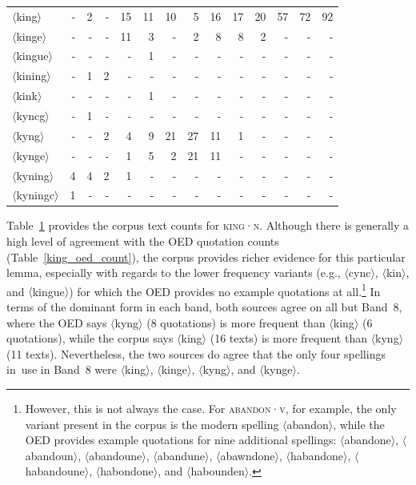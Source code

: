 \documentclass[doc,biblatex]{apa7}
\newcommand\lemma[2]{\textsc{#1·#2}}
\newcommand\spelling[1]{\allowbreak$\langle$#1$\rangle$}
\begin{document}
\begin{table}
\begin{center}
\begin{threeparttable}
\begin{tabular}{lrrrrrrrrrrrrr}
	\spelling{king} & - & 2 & - & 15 & 11 & 10 & 5 & 16 & 17 & 20 & 57 & 72 & 92 \\
	\spelling{kinge} & - & - & - & 11 & 3 & - & 2 & 8 & 8 & 2 & - & - & - \\
	\spelling{kingue} & - & - & - & - & 1 & - & - & - & - & - & - & - & - \\
	\spelling{kining} & - & 1 & 2 & - & - & - & - & - & - & - & - & - & - \\
	\spelling{kink} & - & - & - & - & 1 & - & - & - & - & - & - & - & - \\
	\spelling{kyncg} & - & 1 & - & - & - & - & - & - & - & - & - & - & - \\
	\spelling{kyng} & - & - & 2 & 4 & 9 & 21 & 27 & 11 & 1 & - & - & - & - \\
	\spelling{kynge} & - & - & - & 1 & 5 & 2 & 21 & 11 & - & - & - & - & - \\
	\spelling{kyning} & 4 & 4 & 2 & 1 & - & - & - & - & - & - & - & - & - \\
	\spelling{kyningc} & 1 & - & - & - & - & - & - & - & - & - & - & - & - \\
	\bottomrule
	\end{tabular}
	\label{king_corpus_count}
	\end{threeparttable}
	\end{center}
	\end{table}

Table~\ref{king_corpus_count} provides the corpus text counts for \lemma{king}{n}. Although there is generally a high level of agreement with the OED quotation counts (Table~\ref{king_oed_count}), the corpus provides richer evidence for this particular lemma, especially with regards to the lower frequency variants (e.g., \spelling{cync}, \spelling{kin}, and \spelling{kingue}) for which the OED provides no example quotations at all.\footnote{However, this is not always the case. For \lemma{abandon}{v}, for example, the only variant present in the corpus is the modern spelling \spelling{abandon}, while the OED provides example quotations for nine additional spellings: \spelling{abandone}, \spelling{abandoun}, \spelling{abandoune}, \spelling{abandune}, \spelling{abawndone}, \spelling{habandone}, \spelling{habandoune}, \spelling{habondone}, and \spelling{habounden}.} In terms of the dominant form in each band, both sources agree on all but Band~8, where the OED says \spelling{kyng} (8 quotations) is more frequent than \spelling{king} (6 quotations), while the corpus says \spelling{king} (16 texts) is more frequent than \spelling{kyng} (11 texts). Nevertheless, the two sources do agree that the only four spellings in~use in Band~8 were \spelling{king}, \spelling{kinge}, \spelling{kyng}, and \spelling{kynge}.
\end{document}
